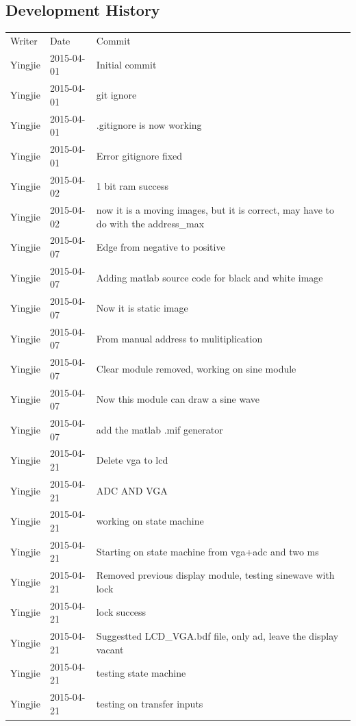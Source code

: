 \documentclass[11pt]{scrartcl}
\begin{document}
\subsection{Development History}
\begin{longtable}{@{\extracolsep{\fill}}lll@{}}
Writer & Date & Commit \\
Yingjie & 2015-04-01 & Initial commit \\ \hline
Yingjie & 2015-04-01 & git ignore \\ \hline
Yingjie & 2015-04-01 & .gitignore is now working \\ \hline
Yingjie & 2015-04-01 & Error gitignore fixed \\ \hline
Yingjie & 2015-04-02 & 1 bit ram success \\ \hline
Yingjie & 2015-04-02 & now it is a moving images, but it is correct, may have to do with the address\_max \\ \hline
Yingjie & 2015-04-07 & Edge from negative to positive \\ \hline
Yingjie & 2015-04-07 & Adding matlab source code for black and white image \\ \hline
Yingjie & 2015-04-07 & Now it is static image \\ \hline
Yingjie & 2015-04-07 & From manual address to mulitiplication \\ \hline
Yingjie & 2015-04-07 & Clear module removed, working on sine module \\ \hline
Yingjie & 2015-04-07 & Now this module can draw a sine wave \\ \hline
Yingjie & 2015-04-07 & add the matlab .mif generator \\ \hline
Yingjie & 2015-04-21 & Delete vga to lcd \\ \hline
Yingjie & 2015-04-21 & ADC AND VGA \\ \hline
Yingjie & 2015-04-21 & working on state machine \\ \hline
Yingjie & 2015-04-21 & Starting on state machine from vga+adc and two ms \\ \hline
Yingjie & 2015-04-21 & Removed previous display module, testing sinewave with lock \\ \hline
Yingjie & 2015-04-21 & lock success \\ \hline
Yingjie & 2015-04-21 & Suggestted LCD\_VGA.bdf file, only ad, leave the display vacant \\ \hline
Yingjie & 2015-04-21 & testing state machine \\ \hline
Yingjie & 2015-04-21 & testing on transfer inputs \\ \hline

\end{longtable}
\end{document}
